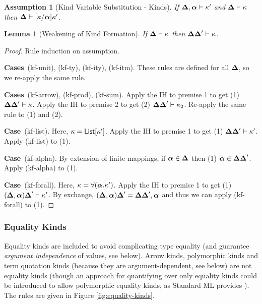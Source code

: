 \documentclass[12pt]{article}
\newtheorem{lemma}{Lemma}
\newtheorem{assumption}{Assumption}
\newcommand{\pfcase}[1]{\textbf{Case}~#1. }
\newcommand{\pfcases}[1]{\textbf{Cases}~#1. }
\begin{document}
\begin{assumption}[Kind Variable Substitution - Kinds]
\label{lemma:kind-variable-substitution-kinds}
If $\boldsymbol\Delta, \boldsymbol{\alpha} \vdash \kappa'$ and $\boldsymbol\Delta \vdash \kappa$ then $\boldsymbol\Delta \vdash [\kappa/\boldsymbol{\alpha}]\kappa'$.
\end{assumption}

\begin{lemma}[Weakening of Kind Formation]
\label{lemma:weakening-of-kind-formation}
If $\boldsymbol\Delta \vdash \kappa$ then $\boldsymbol\Delta\boldsymbol\Delta' \vdash \kappa$.
\end{lemma}
\begin{proof} Rule induction on assumption.

\pfcases{(kf-unit), (kf-ty), (kf-ity), (kf-itm)} These rules are defined for all $\boldsymbol\Delta$, so we re-apply the same rule.

\pfcases{(kf-arrow), (kf-prod), (kf-sum)} Apply the IH to premise 1 to get (1) $\boldsymbol\Delta\boldsymbol\Delta' \vdash \kappa$. Apply the IH to premise 2 to get (2) $\boldsymbol\Delta\boldsymbol\Delta' \vdash \kappa_2$. Re-apply the same rule to (1) and (2).

\pfcase{(kf-list)} Here, $\kappa={\sf List}[\kappa']$. Apply the IH to premise 1 to get (1) $\boldsymbol\Delta\boldsymbol\Delta' \vdash \kappa'$. Apply (kf-list) to (1).

\pfcase{(kf-alpha)} By extension of finite mappings, if $\boldsymbol{\alpha} \in \boldsymbol\Delta$ then (1) $\boldsymbol{\alpha} \in \boldsymbol\Delta\boldsymbol\Delta'$. Apply (kf-alpha) to (1).

\pfcase{(kf-forall)} Here, $\kappa=\forall(\boldsymbol{\alpha}.\kappa')$. Apply the IH to premise 1 to get (1) $(\boldsymbol\Delta, \boldsymbol{\alpha})\boldsymbol\Delta' \vdash \kappa'$. By exchange, $(\boldsymbol\Delta, \boldsymbol{\alpha})\boldsymbol\Delta'=\boldsymbol\Delta\boldsymbol\Delta', \boldsymbol{\alpha}$ and thus we can apply (kf-forall) to (1).

\end{proof}

\subsubsection{Equality Kinds}

Equality kinds are included to avoid complicating type equality (and guarantee \emph{argument independence} of values, see below). Arrow kinds, polymorphic kinds and term quotation kinds (because they are argument-dependent, see below) are not equality kinds (though an approach for quantifying over only equality kinds could be introduced to allow polymorphic equality kinds, as Standard ML provides \cite{Tofte:89:TheDefinitionOfStandardML}). The rules are given in Figure \ref{fig:equality-kinds}. %
\end{document}
